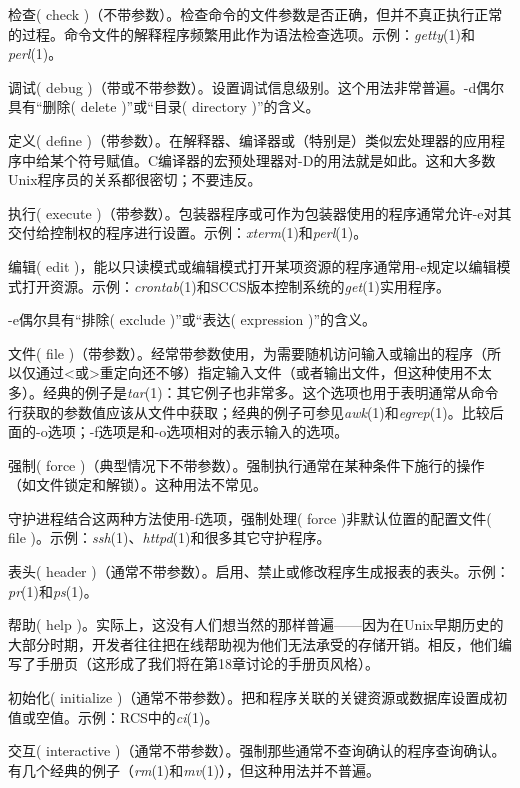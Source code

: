 \documentclass[12pt,oneside]{book}
\begin{document}
\begin{common-format}
\begin{description}
检查( check )（不带参数）。检查命令的文件参数是否正确，但并不真正执行正常的过程。命令文件的解释程序频繁用此作为语法检查选项。示例：\textit{getty}(1)和\textit{perl}(1)。
\item[-d] 调试( debug )（带或不带参数）。设置调试信息级别。这个用法非常普遍。-d偶尔具有“删除( delete )”或“目录( directory )”的含义。
\item[-D] 定义( define )（带参数）。在解释器、编译器或（特别是）类似宏处理器的应用程序中给某个符号赋值。C编译器的宏预处理器对-D的用法就是如此。这和大多数Unix程序员的关系都很密切；不要违反。
\item[-e] 执行( execute )（带参数）。包装器程序或可作为包装器使用的程序通常允许-e对其交付给控制权的程序进行设置。示例：\textit{xterm}(1)和\textit{perl}(1)。

编辑( edit )，能以只读模式或编辑模式打开某项资源的程序通常用-e规定以编辑模式打开资源。示例：\textit{crontab}(1)和SCCS版本控制系统的\textit{get}(1)实用程序。

-e偶尔具有“排除( exclude )”或“表达( expression )”的含义。

\item[-f] 文件( file )（带参数）。经常带参数使用，为需要随机访问输入或输出的程序（所以仅通过<或>重定向还不够）指定输入文件（或者输出文件，但这种使用不太多）。经典的例子是\textit{tar}(1)：其它例子也非常多。这个选项也用于表明通常从命令行获取的参数值应该从文件中获取；经典的例子可参见\textit{awk}(1)和\textit{egrep}(1)。比较后面的-o选项；-f选项是和-o选项相对的表示输入的选项。

强制( force )（典型情况下不带参数）。强制执行通常在某种条件下施行的操作（如文件锁定和解锁）。这种用法不常见。

守护进程结合这两种方法使用-f选项，强制处理( force )非默认位置的配置文件( file )。示例：\textit{ssh}(1)、\textit{httpd}(1)和很多其它守护程序。

\item[-h] 表头( header )（通常不带参数）。启用、禁止或修改程序生成报表的表头。示例：\textit{pr}(1)和\textit{ps}(1)。

帮助( help )。实际上，这没有人们想当然的那样普遍——因为在Unix早期历史的大部分时期，开发者往往把在线帮助视为他们无法承受的存储开销。相反，他们编写了手册页（这形成了我们将在第18章讨论的手册页风格）。

\item[-i] 初始化( initialize )（通常不带参数）。把和程序关联的关键资源或数据库设置成初值或空值。示例：RCS中的\textit{ci}(1)。

交互( interactive )（通常不带参数）。强制那些通常不查询确认的程序查询确认。有几个经典的例子（\textit{rm}(1)和\textit{mv}(1)），但这种用法并不普遍。


\end{description}
\end{common-format}
\end{document}
